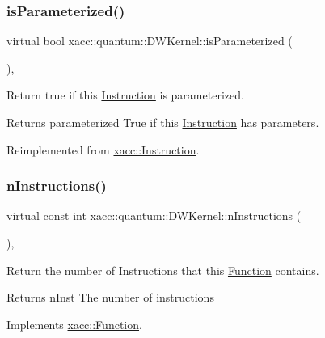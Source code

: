 \subsubsection{\texorpdfstring{is\+Parameterized()}{isParameterized()}}
{\footnotesize\ttfamily virtual bool xacc\+::quantum\+::\+D\+W\+Kernel\+::is\+Parameterized (\begin{DoxyParamCaption}{ }\end{DoxyParamCaption})\hspace{0.3cm}{\ttfamily [inline]}, {\ttfamily [virtual]}}

Return true if this \hyperlink{a01155}{Instruction} is parameterized.

\begin{DoxyReturn}{Returns}
parameterized True if this \hyperlink{a01155}{Instruction} has parameters. 
\end{DoxyReturn}


Reimplemented from \hyperlink{a01155_a7b24d8ae485369fc2b2df7a3224a5e26}{xacc\+::\+Instruction}.

\mbox{\label{a00983_a79aecc7419a20b8779372ef36fc24806}} 
\subsubsection{\texorpdfstring{n\+Instructions()}{nInstructions()}}
{\footnotesize\ttfamily virtual const int xacc\+::quantum\+::\+D\+W\+Kernel\+::n\+Instructions (\begin{DoxyParamCaption}{ }\end{DoxyParamCaption})\hspace{0.3cm}{\ttfamily [inline]}, {\ttfamily [virtual]}}

Return the number of Instructions that this \hyperlink{a01151}{Function} contains.

\begin{DoxyReturn}{Returns}
n\+Inst The number of instructions 
\end{DoxyReturn}


Implements \hyperlink{a01151_a8901985525f59713e14c61713e07c086}{xacc\+::\+Function}.

\mbox{\label{a00983_a029429948329b94c1d89f32cf5c486d4}} 
